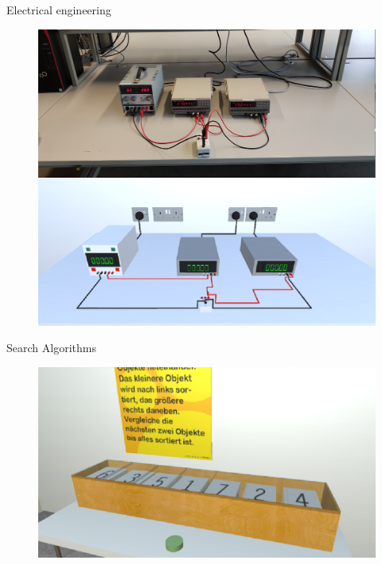 \documentclass[final,hyperref={pdfpagelabels=false}]{beamer}
\begin{document}
\begin{frame}[t]
\begin{columns}[t]
\begin{column}{.465\textwidth} %

\begin{block}{Electrical engineering}
	
	\begin{figure}
		\centering
		\includegraphics[width=0.95\linewidth]{etechnik_vgl}

	\end{figure}
	\vspace{20px}
\end{block}

\vspace{0.3cm}

\begin{block}{Search Algorithms}
	\begin{figure}
		\centering
		\includegraphics[width=0.95\linewidth]{informatiklab_bubblesort}


\end{figure}
\end{block}
\end{column}
\end{columns}
\end{frame}
\end{document}
